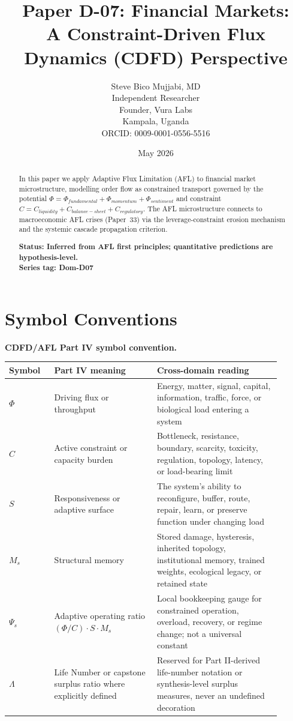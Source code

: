 \documentclass[11pt]{article}
\title{\textbf{Paper D-07: Financial Markets:\\ A Constraint-Driven Flux Dynamics (CDFD) Perspective}}
\author{Steve Bico Mujjabi, MD\\
\small Independent Researcher\\
\small Founder, Vura Labs\\
\small Kampala, Uganda\\
\small ORCID: 0009-0001-0556-5516}
\date{May 2026}
\begin{document}
\maketitle
\newpage


\begin{abstract}
In this paper we apply Adaptive Flux Limitation (AFL) to financial market microstructure,
modelling order flow as constrained transport governed by the potential $\Phi = \Phi_{fundamental}
+ \Phi_{momentum} + \Phi_{sentiment}$ and constraint $C = C_{liquidity} + C_{balance-sheet} +
C_{regulatory}$. The AFL microstructure connects to macroeconomic AFL crises (Paper~33) via
the leverage-constraint erosion mechanism and the systemic cascade propagation criterion.

\textbf{Status: Inferred from AFL first principles; quantitative predictions are hypothesis-level.}\\
\textbf{Series tag: Dom-D07}
\end{abstract}

\section*{Symbol Conventions}

\noindent\textbf{CDFD/AFL Part IV symbol convention.}
\begin{center}
{\small
\begin{tabular}{p{0.15\linewidth}p{0.34\linewidth}p{0.41\linewidth}}
\hline
Symbol & Part IV meaning & Cross-domain reading \\
\hline
$\Phi$ & Driving flux or throughput & Energy, matter, signal, capital, information, traffic, force, or biological load entering a system \\
$C$ & Active constraint or capacity burden & Bottleneck, resistance, boundary, scarcity, toxicity, regulation, topology, latency, or load-bearing limit \\
$S$ & Responsiveness or adaptive surface & The system's ability to reconfigure, buffer, route, repair, learn, or preserve function under changing load \\
$M_s$ & Structural memory & Stored damage, hysteresis, inherited topology, institutional memory, trained weights, ecological legacy, or retained state \\
$\Psi_s$ & Adaptive operating ratio $(\Phi/C)\cdot S\cdot M_s$ & Local bookkeeping gauge for constrained operation, overload, recovery, or regime change; not a universal constant \\
$\Lambda$ & Life Number or capstone surplus ratio where explicitly defined & Reserved for Part II-derived life-number notation or synthesis-level surplus measures, never an undefined decoration \\
\hline
\end{tabular}
}
\end{center}
\end{document}
